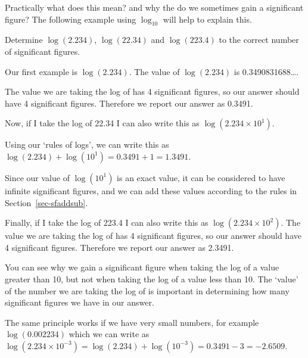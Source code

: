 \documentclass[
  letterpaper,
  DIV=11,
  numbers=noendperiod]{scrreprt}
\begin{document}
Practically what does this mean? and why the do we sometimes gain a
significant figure? The following example using \(\log_{10}\) will help
to explain this.

\begin{tcolorbox}[enhanced jigsaw, arc=.35mm, bottomrule=.15mm, bottomtitle=1mm, breakable, colback=white, colbacktitle=quarto-callout-caution-color!10!white, colframe=quarto-callout-caution-color-frame, coltitle=black, left=2mm, leftrule=.75mm, opacityback=0, opacitybacktitle=0.6, rightrule=.15mm, title=\textcolor{quarto-callout-caution-color}{\faFire}\hspace{0.5em}{Example of significant figures in logs and lns.}, titlerule=0mm, toprule=.15mm, toptitle=1mm]

Determine \(\log (2.234)\), \(\log(22.34)\) and \(\log(223.4)\) to the
correct number of significant figures.

Our first example is \(\log(2.234)\). The value of \(\log(2.234)\) is
0.3490831688\ldots.

The value we are taking the log of has 4 significant figures, so our
answer should have 4 significant figures. Therefore we report our answer
as 0.3491.

Now, if I take the log of 22.34 I can also write this as
\(\log(2.234 \times 10^1)\).

Using our `rules of logs', we can write this as
\(\log(2.234) + \log(10^1) = 0.3491 + 1 = 1.3491\).

Since our value of \(\log(10^1)\) is an exact value, it can be
considered to have infinite significant figures, and we can add these
values according to the rules in Section~\ref{sec-sfaddsub}.

Finally, if I take the log of 223.4 I can also write this as
\(\log(2.234 \times 10^2)\). The value we are taking the log of has 4
significant figures, so our answer should have 4 significant figures.
Therefore we report our answer as 2.3491.

You can see why we gain a significant figure when taking the log of a
value greater than 10, but not when taking the log of a value less than
10. The `value' of the number we are taking the log of is important in
determining how many significant figures we have in our answer.

The same principle works if we have very small numbers, for example
\(\log(0.002234)\) which we can write as
\(\log(2.234 \times 10^{-3}) = \log(2.234) + \log(10^{-3}) = 0.3491 - 3 = -2.6509\).

\end{tcolorbox}


\chapter{}\label{section}


\chapter{}\label{section-1}
\end{document}
